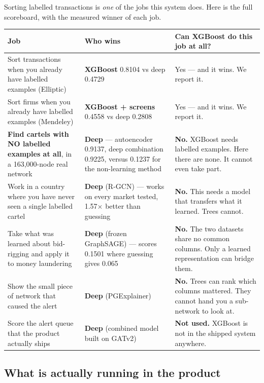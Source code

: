 \documentclass[11pt,a4paper]{article}
\begin{document}
Sorting labelled transactions is \emph{one} of the jobs this system does. Here is
the full scoreboard, with the measured winner of each job.

\begin{longtable}{@{}p{5.0cm}p{4.4cm}p{5.6cm}@{}}
\toprule
\textbf{Job} & \textbf{Who wins} & \textbf{Can XGBoost do this job at all?} \\
\midrule
\endhead
Sort transactions when you already have labelled examples (Elliptic) &
\textbf{XGBoost} 0.8104 vs deep 0.4729 &
Yes --- and it wins. We report it. \\
\addlinespace
Sort firms when you already have labelled examples (Mendeley) &
\textbf{XGBoost + screens} 0.4558 vs deep 0.2808 &
Yes --- and it wins. We report it. \\
\addlinespace
\textbf{Find cartels with NO labelled examples at all}, in a 163{,}000-node real
network &
\textbf{Deep} --- autoencoder 0.9137, deep combination 0.9225, versus 0.1237 for
the non-learning method &
\textbf{No.} XGBoost needs labelled examples. Here there are none. It cannot
even take part. \\
\addlinespace
Work in a country where you have never seen a single labelled cartel &
\textbf{Deep} (R-GCN) --- works on every market tested, 1.57$\times$ better than
guessing &
\textbf{No.} This needs a model that transfers what it learned. Trees cannot. \\
\addlinespace
Take what was learned about bid-rigging and apply it to money laundering &
\textbf{Deep} (frozen GraphSAGE) --- scores 0.1501 where guessing gives 0.065 &
\textbf{No.} The two datasets share no common columns. Only a learned
representation can bridge them. \\
\addlinespace
Show the small piece of network that caused the alert &
\textbf{Deep} (PGExplainer) &
\textbf{No.} Trees can rank which columns mattered. They cannot hand you a
sub-network to look at. \\
\addlinespace
Score the alert queue that the product actually ships &
\textbf{Deep} (combined model built on GATv2) &
\textbf{Not used.} XGBoost is not in the shipped system anywhere. \\
\bottomrule
\end{longtable}

\subsection{What is actually running in the product}
\end{document}

